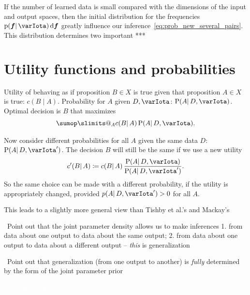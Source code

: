 \documentclass[\ifafour a4paper,12pt,\else a5paper,10pt,\fi%
onecolumn,oneside,article,%
british%
]{memoir}
\makeatletter
\theoremstyle{remark}
\theoremstyle{innote}
\def\sum{\DOTSI\sumop\slimits@}
\newcommand*{\citey}{\parencites*}
\newcommand*{\di}{\mathrm{d}}%
\newcommand*{\defd}{\coloneqq}
\newcommand*{\pf}{\mathrm{p}}%
\newcommand*{\p}{\mathrm{P}}%
\renewcommand*{\|}{\mathpunct{|}}
\newcommand*{\etal}{{et al.}}
\newcommand*{\puzzle}{\maltese}
\newcommand{\mynote}[1]{ {\color{notecolour}\puzzle\ #1}}
\newcommand*{\yI}{\varIota}
\newcommand*{\yf}{\bm{f}}
\makeatother
\begin{document}
If the number of learned data is small compared with the dimensions of the
input and output spaces, then the initial distribution for the frequencies
$\pf(\yf \| \yI)\,\di\yf$ greatly influence our
inference~\eqref{eq:prob_new_several_pairs}. This distribution determines
two important ***



\section{Utility functions and probabilities}
\label{sec:utilities_probs}

Utility of behaving as if proposition $B \in X$ is true given that proposition
$A \in X$ is true: $c(B \|A)$. Probability for $A$ given $D,\yI$: $\p(A \|
D, \yI)$. Optimal decision is $B$ that maximizes
\begin{equation}
  \label{eq:optimal_decision}
  \sum_A c(B \| A)\, \p(A \|D,\yI).
\end{equation}

Now consider different probabilities for all $A$ given the same data $D$:
$\p(A\|D, \yI')$. The decision $B$ will still be the same if we use a new
utility
\begin{equation}
  \label{eq:new_utility}
  c'(B \| A) \defd c(B \|A)\,\frac{\p(A \|D,\yI)}{\p(A \|D,\yI')}.
\end{equation}
So the same choice can be made with a different probability, if the utility
is appropriately changed, provided $p(A \|D,\yI')>0$ for all $A$.

This leads to a slightly more general view than Tishby \etal's
\citey{tishbyetal1989,levinetal1990} and Mackay's \citey{mackay1992,mackay1992b}



\mynote{Point out that the joint parameter density allows us to make
  inferences 1. from data about one output to data about the same output;
  2. from data about one output to data about a different output --
  \emph{this} is generalization}

\mynote{Point out that generalization (from one output to another) is
  \emph{fully} determined by the form of the joint parameter prior}






\newpage


\textcolor{white}{If you find this you can claim a postcard from me.}
%

\setlength{\intextsep}{0.5ex}%
\end{document}
